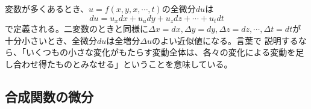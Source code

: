 \documentclass[a4j,dvipdfmx]{jsarticle}
\begin{document}
変数が多くあるとき、$u=f(x,y,x,\cdots,t)$の全微分$du$は
\begin{equation}
    du=u_xdx+u_udy+u_zdz+\cdots+u_tdt
\end{equation}
で定義される。二変数のときと同様に$\Delta x=dx,\Delta y=dy,\Delta z=dz,\cdots,\Delta t=dt$が十分小さいとき、全微分$du$は全増分$\Delta u$のよい近似値になる。言葉で
説明するなら、「いくつもの小さな変化がもたらす変動全体は、各々の変化による変動を足し合わせ得たものとみなせる」ということを意味している。
\subsection{合成関数の微分}
\end{document}
